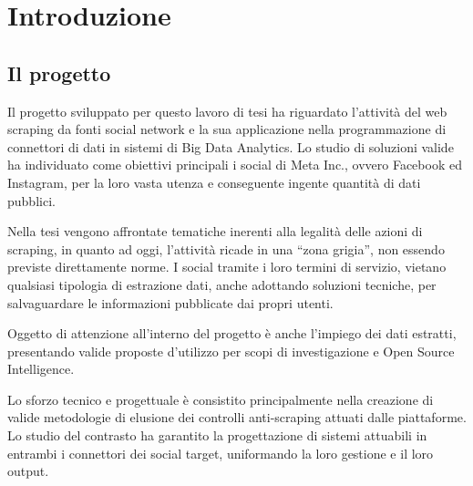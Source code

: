 \chapter{Introduzione}

\label{cap:introduzione}
\section{Il progetto}
Il progetto sviluppato per questo lavoro di tesi ha riguardato l'attivit\`a del web scraping da fonti social network e la sua applicazione nella programmazione di connettori di dati in sistemi di Big Data Analytics. Lo studio di soluzioni valide ha individuato come obiettivi principali i social di Meta Inc., ovvero Facebook ed Instagram, per la loro vasta utenza e conseguente ingente quantit\`a di dati pubblici. 

Nella tesi vengono affrontate tematiche inerenti alla legalit\`a delle azioni di scraping, in quanto ad oggi, l'attivit\`a ricade in  una ``zona grigia'', non essendo previste direttamente norme. I social tramite i loro termini di servizio, vietano qualsiasi tipologia di estrazione dati, anche adottando soluzioni tecniche, per salvaguardare le informazioni pubblicate dai propri utenti.

Oggetto di attenzione all'interno del progetto \`e anche l'impiego dei dati estratti, presentando valide proposte d'utilizzo per scopi di investigazione e Open Source Intelligence.

Lo sforzo tecnico e progettuale \`e consistito principalmente nella creazione di valide metodologie di elusione dei controlli anti-scraping attuati dalle piattaforme. Lo studio del contrasto ha garantito la progettazione di sistemi attuabili in entrambi i connettori dei social target, uniformando la loro gestione e il loro output.


